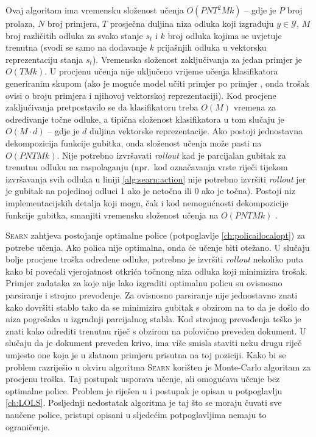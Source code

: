 Ovaj algoritam ima vremensku složenost učenja $O(P N T^2 M k)$ -- gdje je $P$
broj prolaza, $N$ broj primjera, $T$ prosječna duljina niza odluka koji
izgrađuju $y \in \mathcal{Y}$, $M$ broj različitih odluka za svako stanje $s_t$
i $k$ broj odluka kojima se uvjetuje trenutna (svodi se samo na dodavanje $k$
prijašnjih odluka u vektorsku reprezentaciju stanja $s_t$). Vremenska složenost
zaključivanja za jedan primjer je $O(T M k)$. U procjenu učenja nije uključeno
vrijeme učenja klasifikatora generiranim skupom (ako je moguće model učiti
primjer po primjer , onda trošak ovisi o broju primjera i njihovoj
vektorskoj reprezentaciji). Kod procjene zaključivanja pretpostavilo se da
klasifikatoru treba $O(M)$ vremena za određivanje točne odluke, a tipična
složenost klasifikatora u tom slučaju je $O(M \cdot d)$ -- gdje je $d$ duljina
vektorske reprezentacije. Ako postoji jednostavna dekompozicija funkcije
gubitka, onda složenost učenja može pasti na $O(P N T M k)$. Nije potrebno
izvršavati \textit{rollout} kad je parcijalan gubitak za trenutnu odluku na
raspolaganju (npr.~kod označavanja vrste riječi tijekom izvršavanja svih odluka
u liniji \ref{alg:searn:action} nije potrebno izvršiti \textit{rollout} jer je
gubitak na pojedinoj odluci 1 ako je netočna ili 0 ako je točna). Postoji niz
implementacijskih detalja koji mogu, čak i kod nemogućnosti dekompozicije
funkcije gubitka, smanjiti vremensku složenost učenja na $O(P N T M k)$
\citep{daume14lts}.

\textsc{Searn} zahtjeva postojanje optimalne police (potpoglavlje
\ref{ch:policailocalopt}) za potrebe učenja. Ako polica nije optimalna, onda će
učenje biti otežano. U slučaju bolje procjene troška određene odluke, potrebno je
izvršiti \textit{rollout} nekoliko puta kako bi povećali vjerojatnost otkrića
točnong niza odluka koji minimizira trošak. Primjer zadataka za koje nije lako
izgraditi optimalnu policu su ovisnosno parsiranje i strojno prevođenje. Za
ovisnosno parsiranje nije jednostavno znati kako dovršiti stablo tako da se
minimizira gubitak s obzirom na to da je došlo do niza pogrešaka u izgradnji
parcijalnog stabla. Kod strojnog prevođenja teško je znati kako odrediti
trenutnu riječ s obzirom na polovično preveden dokument. U slučaju da je
dokument preveden krivo, ima više smisla staviti neku drugu riječ umjesto
one koja je u zlatnom primjeru prisutna na toj poziciji. Kako bi se problem
razriješio u okviru algoritma \textsc{Searn} korišten je Monte-Carlo algoritam
za procjenu troška. Taj postupak usporava učenje, ali omogućava učenje bez
optimalne police. Problem je riješen u \citep{daume15lols} i postupak je opisan
u potpoglavlju \ref{ch:LOLS}. Posljednji nedostatak algoritma je taj što se
moraju čuvati sve naučene police, pristupi opisani u sljedećim potpoglavljima
nemaju to ograničenje.

